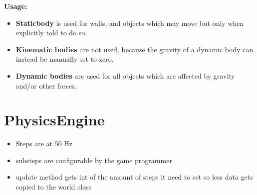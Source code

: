 \noindent
\textbf{Usage:}
\begin{itemize}
    \item \textbf{Staticbody} is used for walls, and objects which may move but only when explicitly told to do so.
    \item \textbf{Kinematic bodies} are not used, because the gravity of a dynamic body can instead be manually set to zero.
    \item \textbf{Dynamic bodies} are used for all objects which are affected by gravity and/or other forces.
\end{itemize}

\section{PhysicsEngine}{
  \begin{itemize}
      \item Steps are at 50 Hz
      \item substeps are configurable by the game programmer
      \item update method gets int of the amount of steps it need to set so less data gets copied to the world class
  \end{itemize}
 }